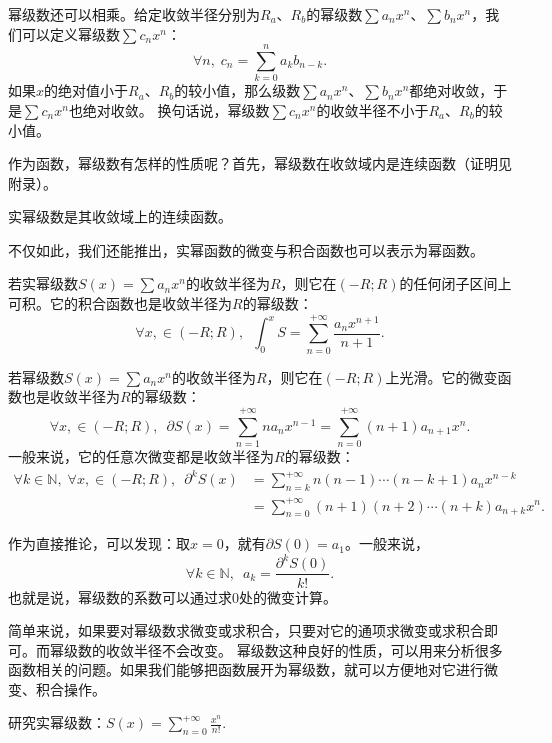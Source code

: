 \documentclass[12pt,UTF8,fontset=none]{ctexbook}
\begin{document}
幂级数还可以相乘。给定收敛半径分别为$R_a$、$R_b$的幂级数$\sum a_n x^n$、$\sum b_n x^n$，我们可以定义幂级数$\sum c_n x^n$：
$$ \forall n, \; c_n = \sum_{k=0}^n a_k b_{n-k}.$$
如果$x$的绝对值小于$R_a$、$R_b$的较小值，那么级数$\sum a_n x^n$、$\sum b_n x^n$都绝对收敛，于是$\sum c_n x^n$也绝对收敛。
换句话说，幂级数$\sum c_n x^n$的收敛半径不小于$R_a$、$R_b$的较小值。

作为函数，幂级数有怎样的性质呢？首先，幂级数在收敛域内是连续函数（证明见附录）。

\begin{tm}
    实幂级数是其收敛域上的连续函数。
\end{tm}

不仅如此，我们还能推出，实幂函数的微变与积合函数也可以表示为幂函数。

\begin{tm}
    若实幂级数$S(x) = \sum a_n x^n$的收敛半径为$R$，则它在$(-R;R)$的任何闭子区间上可积。它的积合函数也是收敛半径为$R$的幂级数：
    $$ \forall x, \in (-R;R),\,\,\, \int_0^x S =  \sum_{n=0}^{+\infty} \frac{a_n x^{n+1}}{n + 1}. $$
\end{tm}

\begin{tm}
    若幂级数$S(x) = \sum a_n x^n$的收敛半径为$R$，则它在$(-R;R)$上光滑。它的微变函数也是收敛半径为$R$的幂级数：
    $$ \forall x, \in (-R;R),\,\,\, \partial S(x) =  \sum_{n=1}^{+\infty} na_n x^{n-1} = \sum_{n=0}^{+\infty} (n + 1)a_{n+1} x^{n}. $$
    一般来说，它的任意次微变都是收敛半径为$R$的幂级数：
    \begin{align*}
        \forall k \in \mathbb{N},\;\forall x, \in (-R;R),\,\,\, \partial^k S(x) &= \sum_{n=k}^{+\infty} n(n-1)\cdots(n - k + 1)a_n x^{n-k} \\
        &= \sum_{n=0}^{+\infty} (n + 1)(n + 2)\cdots(n + k)a_{n+k} x^{n}. 
    \end{align*}
\end{tm}

作为直接推论，可以发现：取$x=0$，就有$\partial S(0) = a_1$。一般来说，
$$\forall k\in \mathbb{N}, \,\,\, a_k = \frac{\partial^k S(0)}{k!}.$$
也就是说，幂级数的系数可以通过求$0$处的微变计算。

简单来说，如果要对幂级数求微变或求积合，只要对它的通项求微变或求积合即可。而幂级数的收敛半径不会改变。
幂级数这种良好的性质，可以用来分析很多函数相关的问题。如果我们能够把函数展开为幂级数，就可以方便地对它进行微变、积合操作。

\begin{et}
    研究实幂级数：$S(x) = \sum_{n=0}^{+\infty} \frac{x^n}{n!}. $
\end{et}
\end{document}
